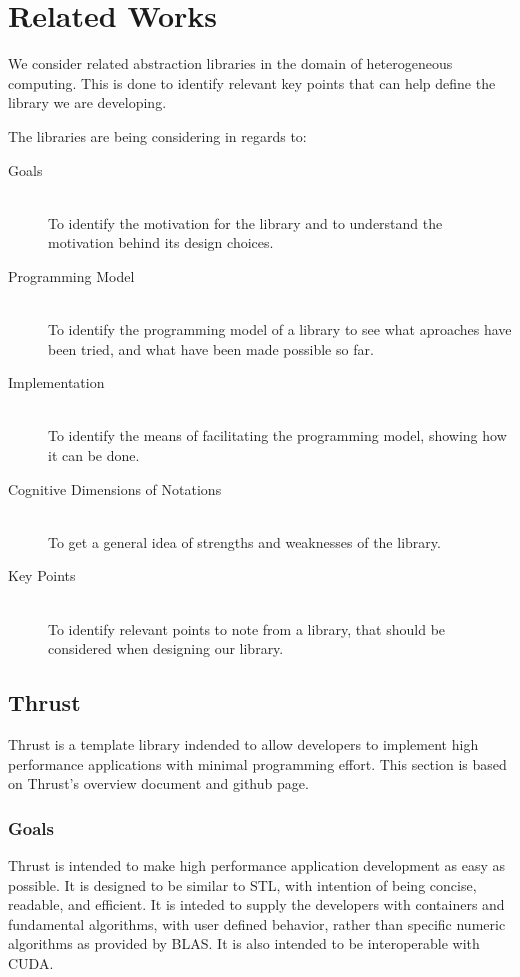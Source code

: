 \section{Related Works}
We consider related abstraction libraries in the domain of heterogeneous computing. This is done to identify relevant key points that can help define the library we are developing.

The libraries are being considering in regards to:
\begin{description}
\item[Goals] \hfill \\
To identify the motivation for the library and to understand the motivation behind its design choices.
\item[Programming Model] \hfill \\
To identify the programming model of a library to see what aproaches have been tried, and what have been made possible so far.
\item[Implementation] \hfill \\
To identify the means of facilitating the programming model, showing how it can be done.
\item[Cognitive Dimensions of Notations] \hfill \\
To get a general idea of strengths and weaknesses of the library.
\item[Key Points] \hfill \\
To identify relevant points to note from a library, that should be considered when designing our library.
\end{description}

 
\subsection{Thrust}
Thrust is a template library indended to allow developers to implement high performance applications with minimal programming effort. This section is based on Thrust's overview document\cite{thrustOverview} and github page\cite{thrustGithub}.

\subsubsection{Goals}
Thrust is intended to make high performance application development as easy as possible. It is designed to be similar to STL, with intention of being concise, readable, and efficient. It is inteded to supply the developers with containers and fundamental algorithms, with user defined behavior, rather than specific numeric algorithms as provided by BLAS. It is also intended to be interoperable with CUDA.

